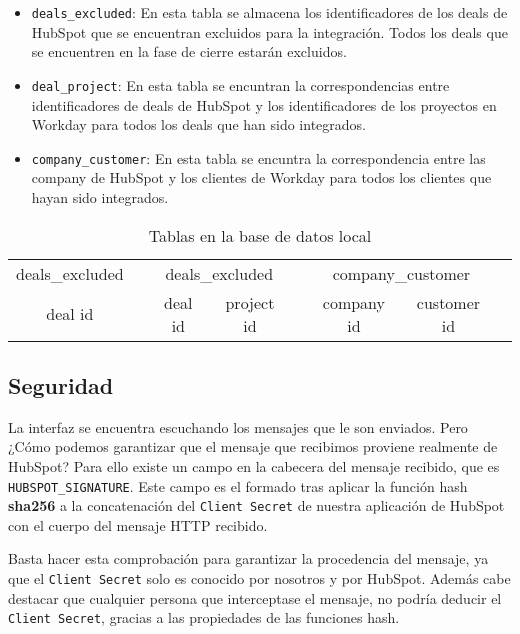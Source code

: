 \begin{itemize}[leftmargin=*]
 
 \begin{itemize}
	\item \verb|deals_excluded|: En esta tabla se almacena los identificadores de los deals de HubSpot 
	que se encuentran excluidos para la integración. Todos los deals que se encuentren en la fase de
	cierre estarán excluidos.
	\item \verb|deal_project|: En esta tabla se encuntran la correspondencias entre identificadores 
	de deals de HubSpot y los identificadores de los proyectos en Workday para todos los deals que han sido integrados.
	\item \verb|company_customer|: En esta tabla se encuntra la correspondencia entre las company de HubSpot y los clientes de Workday
	para todos los clientes que hayan sido integrados.
 \end{itemize}
 
\begin{table}
		\centering
		\begin{tabular}{
		|c|c@{\hskip 1cm} 
		|c|c|c@{\hskip 1cm} 
		|c|c|c@{\hskip 1cm}
		}
		\cline{1-1}\cline{3-4}\cline{6-7}
		deals\_excluded && \multicolumn{2}{c|}{deals\_excluded} && \multicolumn{2}{c|}{company\_customer} \\
	\cline{1-1}\cline{3-4}\cline{6-7}
	deal id && deal id & project id && company id & customer id \\
	\cline{1-1}\cline{3-4}\cline{6-7}
	\end{tabular}
	\caption{Tablas en la base de datos local}
	\label{tab:tables}
\end{table}

\end{itemize}




\subsection{Seguridad}


La interfaz se encuentra escuchando los mensajes que le son enviados. Pero ¿Cómo podemos garantizar que el mensaje que recibimos proviene realmente de HubSpot?
Para ello existe un campo en la cabecera del mensaje recibido, que es \verb|HUBSPOT_SIGNATURE|. 
Este campo es el formado tras aplicar la función hash \textbf{sha256} a la concatenación del \verb|Client Secret| de nuestra aplicación de HubSpot con el cuerpo del mensaje HTTP recibido.

Basta hacer esta comprobación para garantizar la procedencia del mensaje, ya que el \verb|Client Secret| solo es conocido por nosotros y por HubSpot. 
Además cabe destacar que cualquier persona que interceptase el mensaje, no podría deducir el \verb|Client Secret|, gracias a las propiedades de las funciones hash. 

